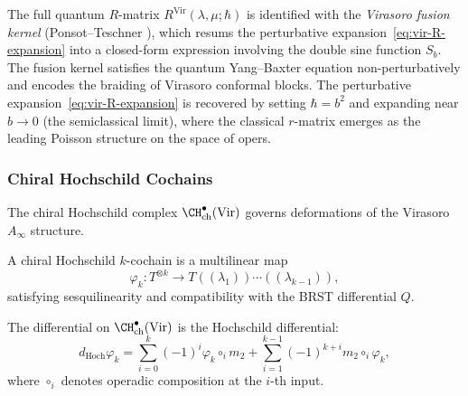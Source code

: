 \begin{remark}
The full quantum $R$-matrix
$R^{\text{Vir}}(\lambda,\mu;\hbar)$ is identified with the
\emph{Virasoro fusion kernel} (Ponsot--Teschner
\cite{PT01}), which resums the
perturbative expansion~\eqref{eq:vir-R-expansion} into a
closed-form expression involving the double sine function
$S_b$. The fusion kernel satisfies the quantum Yang--Baxter
equation non-perturbatively and encodes the braiding of
Virasoro conformal blocks. The perturbative
expansion~\eqref{eq:vir-R-expansion} is recovered by setting
$\hbar = b^2$ and expanding near $b \to 0$ (the semiclassical
limit), where the classical $r$-matrix emerges as the
leading Poisson structure on the space of opers.
\end{remark}

\subsubsection{Chiral Hochschild Cochains}

The chiral Hochschild complex $\CH^\bullet_{\text{ch}}(\text{Vir})$ governs deformations of the Virasoro $A_\infty$ structure.

\begin{definition}
A chiral Hochschild $k$-cochain is a multilinear map
\begin{equation}
\varphi_k: T^{\otimes k} \to T((\lambda_1))\cdots((\lambda_{k-1})),
\end{equation}
satisfying sesquilinearity and compatibility with the BRST differential $Q$.
\end{definition}

The differential on $\CH^\bullet_{\text{ch}}(\text{Vir})$ is the Hochschild differential:
\begin{equation}
d_{\text{Hoch}} \varphi_k = \sum_{i=0}^k (-1)^i \varphi_k \circ_i m_2 + \sum_{i=1}^{k-1} (-1)^{k+i} m_2 \circ_i \varphi_k,
\end{equation}
where $\circ_i$ denotes operadic composition at the $i$-th input.

